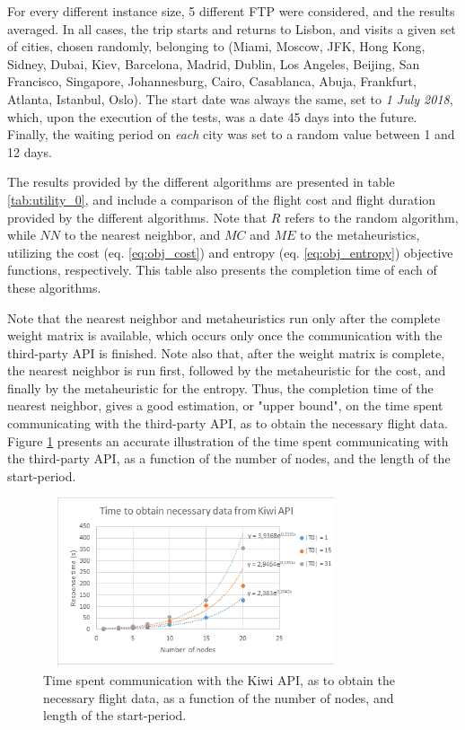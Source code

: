 For every different instance size, 5 different FTP were considered, and the results averaged. In all cases, the trip starts and returns to Lisbon, and visits a given set of cities, chosen randomly, belonging to (Miami, Moscow, JFK, Hong Kong, Sidney, Dubai, Kiev, Barcelona, Madrid, Dublin, Los Angeles, Beijing, San Francisco, Singapore, Johannesburg, Cairo, Casablanca, Abuja, Frankfurt, Atlanta, Istanbul, Oslo). The start date was always the same, set to \textit{1 July 2018}, which, upon the execution of the tests, was a date 45 days into the future. Finally, the waiting period on \textit{each} city was set to a random value between 1 and 12 days. 

The results provided by the different algorithms are presented in table \ref{tab:utility_0}, and include a comparison of the flight cost and flight duration provided by the different algorithms. Note that $R$ refers to the random algorithm, while $NN$ to the nearest neighbor, and $MC$ and $ME$ to the metaheuristics, utilizing the cost (eq. \ref{eq:obj_cost}) and entropy (eq. \ref{eq:obj_entropy}) objective functions, respectively. This table also presents the completion time of each of these algorithms. 

Note that the nearest neighbor and metaheuristics run only after the complete weight matrix is available, which occurs only once the communication with the third-party API is finished. Note also that, after the weight matrix is complete, the nearest neighbor is run first, followed by the metaheuristic for the cost, and finally by the metaheuristic for the entropy. Thus, the completion time of the nearest neighbor, gives a good estimation, or "upper bound", on the time spent communicating with the third-party API, as to obtain the necessary flight data. Figure \ref{fig:kiwi_response_time} presents an accurate illustration of the time spent communicating with the third-party API, as a function of the number of nodes, and the length of the start-period.  

\begin{figure}[tbp]
  \centering
  \includegraphics[width=9cm, height=5cm]{./imgs/kiwi_response_time.png}
  \caption{Time spent communication with the Kiwi API, as to obtain the necessary flight data, as a function of the number of nodes, and length of the start-period.}
  \label{fig:kiwi_response_time}  
\end{figure}

